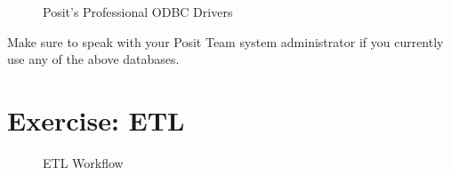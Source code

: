 \documentclass[
  letterpaper,
  DIV=11,
  numbers=noendperiod]{scrreprt}
\begin{document}
\begin{figure}


\caption{\label{fig-posit-odbc-drivers}Posit's Professional ODBC
Drivers}

\end{figure}%

Make sure to speak with your Posit Team system administrator if you
currently use any of the above databases.

\chapter{Exercise: ETL}\label{exercise-etl}

\begin{figure}


\caption{\label{fig-etl-workflow}ETL Workflow}

\end{figure}%
\end{document}
